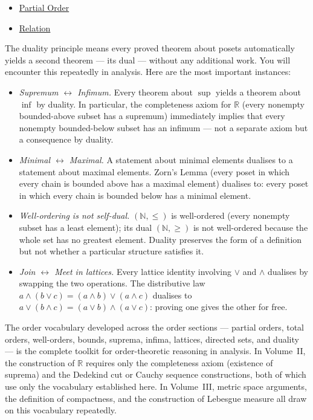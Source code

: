 \begin{dependencies}
\begin{itemize}
  \item \hyperref[def:partial-order]{Partial Order}
  \item \hyperref[def:relation]{Relation}
\end{itemize}
\end{dependencies}

\begin{remark*}
\label{rem:duality-pairs}
The duality principle means every proved theorem about posets automatically
yields a second theorem --- its dual --- without any additional work.  You will
encounter this repeatedly in analysis.  Here are the most important instances:
\begin{itemize}
  \item \emph{Supremum $\leftrightarrow$ Infimum.}  Every theorem about
        $\sup$ yields a theorem about $\inf$ by duality.  In particular,
        the completeness axiom for $\mathbb{R}$ (every nonempty bounded-above
        subset has a supremum) immediately implies that every nonempty
        bounded-below subset has an infimum --- not a separate axiom but a
        consequence by duality.
  \item \emph{Minimal $\leftrightarrow$ Maximal.}  A statement about minimal
        elements dualises to a statement about maximal elements.  Zorn's Lemma
        (every poset in which every chain is bounded above has a maximal
        element) dualises to: every poset in which every chain is bounded below
        has a minimal element.
  \item \emph{Well-ordering is not self-dual.}
        $(\mathbb{N}, \leq)$ is well-ordered (every nonempty subset has a
        least element); its dual $(\mathbb{N}, \geq)$ is not well-ordered
        because the whole set has no greatest element.  Duality preserves
        the form of a definition but not whether a particular structure
        satisfies it.
  \item \emph{Join $\leftrightarrow$ Meet in lattices.}  Every lattice identity
        involving $\vee$ and $\wedge$ dualises by swapping the two operations.
        The distributive law $a \wedge (b \vee c) = (a \wedge b) \vee
        (a \wedge c)$ dualises to $a \vee (b \wedge c) =
        (a \vee b) \wedge (a \vee c)$: proving one gives the other for free.
\end{itemize}
\end{remark*}

\begin{remark*}[Transition]
\label{rem:hasse-transition}
The order vocabulary developed across the order sections --- partial orders,
total orders, well-orders, bounds, suprema, infima, lattices, directed sets,
and duality --- is the complete toolkit for order-theoretic reasoning in analysis.
In Volume~II, the construction of $\mathbb{R}$ requires only the completeness
axiom (existence of suprema) and the Dedekind cut or Cauchy sequence
constructions, both of which use only the vocabulary established here.  In
Volume~III, metric space arguments, the definition of compactness, and the
construction of Lebesgue measure all draw on this vocabulary repeatedly.
\end{remark*}
